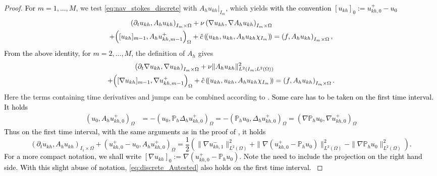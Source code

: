 \documentclass{m2an}
\newcommand\blue[1]{\textcolor{black}{#1}}
\newcommand{\ImOprod}[1]{\left( #1 \right)_{I_m\times\Omega}}
\newcommand{\IjOprod}[2]{\left( #1 \right)_{I_{#2}\times\Omega}}
\newcommand{\Oprod}[1]{\left( #1 \right)_{\Omega}}
\newcommand{\chatIO}[1]{\hat c \left(\!\left( #1 \right)\!\right)}
\newcommand{\ukh}{u_{kh}}
\newcommand{\Ph}{\mathbb P_h}
\begin{document}
\begin{proof}
  \blue{For $m=1,...,M$,} we test \eqref{eq:nav_stokes_discrete} with $A_h \ukh |_{I_m}$, which yields
  \blue{with the convention $[\ukh]_0 := u_{kh,0}^+ - u_0$}
   \begin{align*}
     \blue{\ImOprod{\partial_t \ukh,A_h \ukh}} + \nu \ImOprod{\nabla \ukh,\nabla A_h \ukh}
     &\\
     + \blue{\Oprod{[\ukh]_{m-1},A_h u_{kh,m-1}^+}} + \chatIO{\ukh,\ukh,A_h \ukh \chi_{I_m}} 
     &= \ImOprod{f,A_h \ukh},%
   \end{align*}
   \blue{From the above identity, for $m=2,...,M$,} the definition of $A_h$ gives
   \begin{equation}\label{eq:discrete_Autested}
     \begin{aligned}
       \blue{\ImOprod{\partial_t \nabla \ukh,\nabla \ukh}} + \nu \|A_h \ukh\|_{L^2(I_m;L^2(\Omega))}^2 
     &\\
     +\blue{\Oprod{[\nabla \ukh]_{m-1},\nabla u_{kh,m-1}^+}} + \chatIO{\ukh,\ukh,A_h \ukh \chi_{I_m}}
     &= \ImOprod{f,A_h \ukh}. %
     \end{aligned}
   \end{equation}
   Here the terms containing time derivatives and jumps can be combined according to .
   \blue{Some care has to be taken on the first time interval. It holds 
\begin{align*}
  \Oprod{u_0,A_h u_{kh,0}^+} &=- \Oprod{u_0, \Ph \Delta_h u_{kh,0}^+}=
   - \Oprod{\Ph u_0,\Delta_h u_{kh,0}^+} = \Oprod{\nabla \Ph u_0,\nabla u_{kh,0}^+}
\end{align*}
Thus on the first time interval, with the same arguments as in the proof of \Cref{lemm:jump_reorder}, it holds 
\begin{equation*}
  \IjOprod{\partial_t \ukh,A_h \ukh}{1} + \Oprod{u_{kh,0}^+ - u_0,A_h u_{kh,0}^+}
  = \frac{1}{2} \left(\|\nabla u_{kh,1}^-\|_{L^2(\Omega)}^2 + \|\nabla (u_{kh,0}^+-\Ph u_0)\|_{L^2(\Omega)}^2 
  - \|\nabla \Ph u_0\|_{L^2(\Omega)}^2\right).
\end{equation*}
For a more compact notation, we shall write $[\nabla \ukh]_0 := \nabla (u_{kh,0}^+-\Ph u_0)$.
Note the need to include the projection on the right hand side.
With this slight abuse of notation, \eqref{eq:discrete_Autested} also holds on the first time interval.
}
\end{proof}
\end{document}
